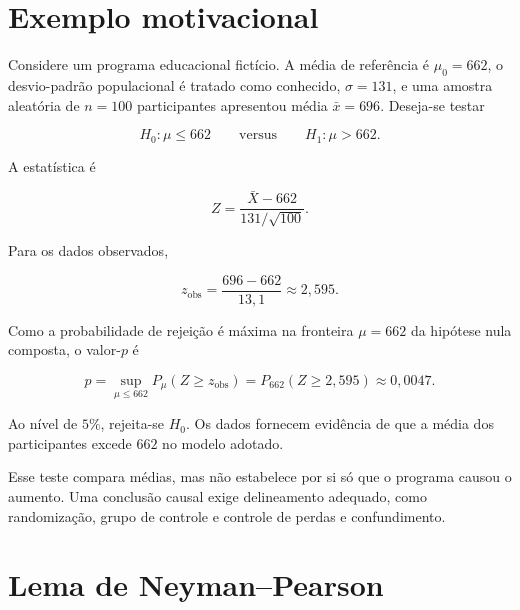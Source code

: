 \documentclass[
  letterpaper,
  DIV=11,
  numbers=noendperiod]{scrreprt}
\begin{document}
\section{Exemplo motivacional}\label{exemplo-motivacional}

Considere um programa educacional fictício. A média de referência é
\(\mu_0=662\), o desvio-padrão populacional é tratado como conhecido,
\(\sigma=131\), e uma amostra aleatória de \(n=100\) participantes
apresentou média \(\bar{x}=696\). Deseja-se testar

\[H_0:\mu\leq 662
\qquad\text{versus}\qquad
H_1:\mu>662.\]

A estatística é

\[Z
=\frac{\bar{X}-662}{131/\sqrt{100}}.\]

Para os dados observados,

\[z_{\text{obs}}
=\frac{696-662}{13{,}1}
\approx 2{,}595.\]

Como a probabilidade de rejeição é máxima na fronteira \(\mu=662\) da
hipótese nula composta, o valor-\(p\) é

\[p=\sup_{\mu\leq662}
P_\mu(Z\geq z_{\mathrm{obs}})
=
P_{662}(Z\geq2{,}595)
\approx0{,}0047.\]

Ao nível de \(5\%\), rejeita-se \(H_0\). Os dados fornecem evidência de
que a média dos participantes excede \(662\) no modelo adotado.

\begin{tcolorbox}[enhanced jigsaw, colback=white, leftrule=.75mm, colbacktitle=quarto-callout-warning-color!10!white, breakable, titlerule=0mm, bottomtitle=1mm, title=\textcolor{quarto-callout-warning-color}{\faExclamationTriangle}\hspace{0.5em}{Limitação causal}, colframe=quarto-callout-warning-color-frame, toprule=.15mm, opacityback=0, bottomrule=.15mm, opacitybacktitle=0.6, arc=.35mm, toptitle=1mm, rightrule=.15mm, coltitle=black, left=2mm]

Esse teste compara médias, mas não estabelece por si só que o programa
causou o aumento. Uma conclusão causal exige delineamento adequado, como
randomização, grupo de controle e controle de perdas e confundimento.

\end{tcolorbox}

\section{Lema de Neyman--Pearson}\label{lema-de-neymanpearson}
\end{document}

